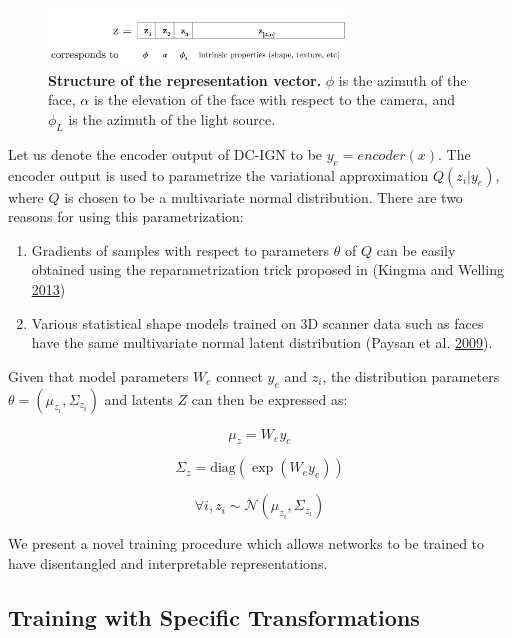 \documentclass[12pt,twoside]{mitthesis}
\providecommand{\tightlist}{%
  \setlength{\itemsep}{0pt}\setlength{\parskip}{0pt}}
\begin{document}
\begin{figure}[htbp]
\centering
\includegraphics[width=0.70000\textwidth]{figures/latents_legend.pdf}
\caption{\label{fig:latentslegend}\textbf{Structure of the
representation vector.} $\phi$ is the azimuth of the face, $\alpha$
is the elevation of the face with respect to the camera, and $\phi_L$
is the azimuth of the light source.}
\end{figure}

Let us denote the encoder output of DC-IGN to be $y_e = encoder(x)$.
The encoder output is used to parametrize the variational approximation
$Q(z_i|y_e)$, where $Q$ is chosen to be a multivariate normal
distribution. There are two reasons for using this parametrization:

\begin{enumerate}
\def\labelenumi{\arabic{enumi}.}
\tightlist
\item
  Gradients of samples with respect to parameters $\theta$ of $Q$
  can be easily obtained using the reparametrization trick proposed in
  (Kingma and Welling \protect\hyperlink{ref-kingma2013auto}{2013})
\item
  Various statistical shape models trained on 3D scanner data such as
  faces have the same multivariate normal latent distribution (Paysan et
  al. \protect\hyperlink{ref-paysan2009face}{2009}).
\end{enumerate}

Given that model parameters $W_e$ connect $y_e$ and $z_i$, the
distribution parameters $\theta = (\mu_{z_i}, \Sigma_{z_i})$ and
latents $Z$ can then be expressed as:

\[\mu_{z} = W_e  y_e\]

\[\Sigma_{z} = \text{diag}(\exp(W_e  y_e))\]

\[\forall{i}, z_i \sim \mathcal{N}(\mu_{z_i}, \Sigma_{z_i})\]

We present a novel training procedure which allows networks to be
trained to have disentangled and interpretable representations.

\subsection{Training with Specific
Transformations}\label{sec:specifictransforms}
\end{document}
